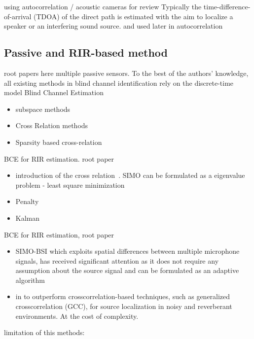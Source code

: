 using autocorrelation / acoustic cameras
 for review Typically the time-difference-of-arrival (TDOA) of the direct path is estimated with the aim to localize a speaker or an interfering sound source.
 and used later in 
autocorrelation 


\subsection{Passive and RIR-based method}
root papers 
here multiple passive sensors.
To the best of the authors’ knowledge, all existing methods in blind channel identification rely on the discrete-time model
Blind Channel Estimation~
\begin{itemize}
    \item subspace methods
    \item Cross Relation methods
    \item Sparsity based cross-relation
\end{itemize}

BCE for RIR estimation. root paper 
\begin{itemize}
    \item introduction of the cross relation~. SIMO can be formulated as a eigenvalue problem - least square minimization
    \item Penalty
    \item Kalman 
\end{itemize}

BCE for RIR estimation, root paper 
\begin{itemize}
    \item SIMO-BSI which exploits spatial differences between multiple microphone signals, has received significant attention as it does not require any assumption about the source signal and can be formulated as an adaptive algorithm~
    \item in  to outperform crosscorrelation-based techniques, such as generalized crosscorrelation (GCC), for source localization in noisy and reverberant environments. At the cost of complexity.
\end{itemize}

limitation of this methods:

